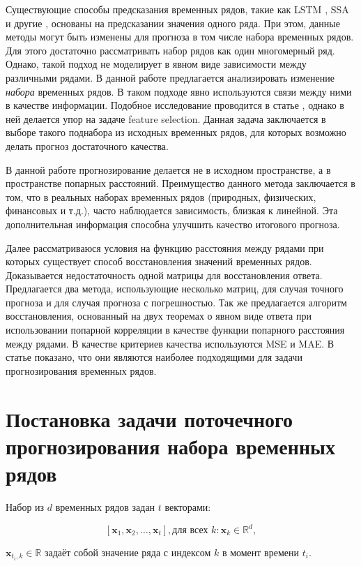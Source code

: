 \documentclass{article}
\begin{document}
	Существующие способы предсказания временных рядов, такие как LSTM \cite{LSTM}, SSA \cite{SSA} и другие \cite{Biosignals}, \cite{boyd2017multiperiod} основаны на предсказании значения одного ряда. При этом, данные методы могут быть изменены для прогноза в том числе набора временных рядов. Для этого достаточно рассматривать набор рядов как один многомерный ряд. Однако, такой подход не моделирует в явном виде зависимости между различными рядами. В данной работе предлагается анализировать изменение \textit{набора} временных рядов. В таком подходе явно используются связи между ними в качестве информации. Подобное исследование проводится в статье \cite{MulticorrelatedQuadratic}, однако в ней делается упор на задаче feature selection. Данная задача заключается в выборе такого поднабора из исходных временных рядов, для которых возможно делать прогноз достаточного качества.
	
	В данной работе прогнозирование делается не в исходном пространстве, а в пространстве попарных расстояний. Преимущество данного метода заключается в том, что в реальных наборах временных рядов (природных, физических, финансовых и т.д.), часто наблюдается зависимость, близкая к линейной. Эта дополнительная информация способна улучшить качество итогового прогноза.
	
	Далее рассматриваюся условия на функцию расстояния между рядами при которых существует способ восстановления значений временных рядов. Доказывается недостаточность одной матрицы для восстановления ответа. Предлагается два метода, использующие несколько матриц, для случая точного прогноза и для случая прогноза с погрешностью. Так же предлагается алгоритм восстановления, основанный на двух теоремах о явном виде ответа при использовании попарной корреляции в качестве функции попарного расстояния между рядами. В качестве критериев качества используются MSE и MAE. В статье \cite{jadon2022comprehensive} показано, что они являются наиболее подходящими для задачи прогнозирования временных рядов.

\section{Постановка задачи поточечного прогнозирования набора временных рядов}

Набор из $d$ временных рядов задан $t$ векторами:

$$[\mathbf{x}_1, \mathbf{x}_2, \ldots, \mathbf{x}_t], \text{для всех } k: \mathbf{x}_k \in \mathbb{R}^d, $$

$\mathbf{x}_{t_i, k} \in \mathbb{R}$ задаёт собой значение ряда с индексом $k$ в момент времени $t_i$.
\end{document}
